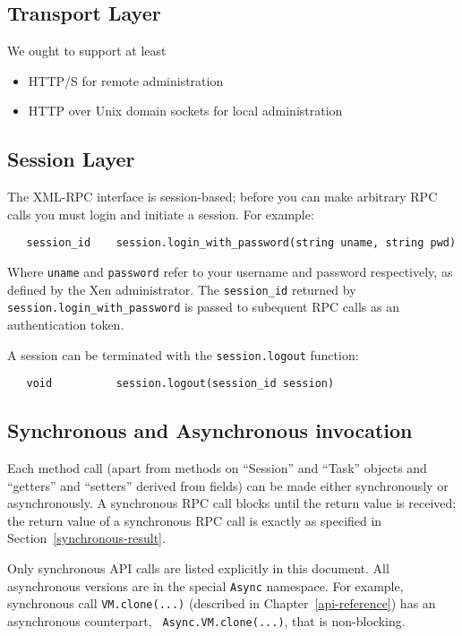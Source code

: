 \subsection{Transport Layer}

We ought to support at least
\begin{itemize}
\item HTTP/S for remote administration
\item HTTP over Unix domain sockets for local administration
\end{itemize}

\subsection{Session Layer}

The XML-RPC interface is session-based; before you can make arbitrary RPC calls
you must login and initiate a session. For example:
\begin{verbatim}
   session_id    session.login_with_password(string uname, string pwd)
\end{verbatim}
Where {\tt uname} and {\tt password} refer to your username and password
respectively, as defined by the Xen administrator.
The {\tt session\_id} returned by {\tt session.login\_with\_password} is passed
to subequent RPC calls as an authentication token.

A session can be terminated with the {\tt session.logout} function:
\begin{verbatim}
   void          session.logout(session_id session)
\end{verbatim}

\subsection{Synchronous and Asynchronous invocation}

Each method call (apart from methods on ``Session'' and ``Task'' objects 
and ``getters'' and ``setters'' derived from fields)
can be made either synchronously or asynchronously.
A synchronous RPC call blocks until the
return value is received; the return value of a synchronous RPC call is
exactly as specified in Section~\ref{synchronous-result}.

Only synchronous API calls are listed explicitly in this document. 
All asynchronous versions are in the special {\tt Async} namespace.
For example, synchronous call {\tt VM.clone(...)}
(described in Chapter~\ref{api-reference})
has an asynchronous counterpart, {\tt
Async.VM.clone(...)}, that is non-blocking.

